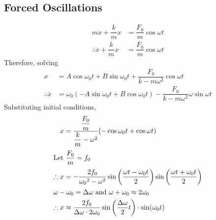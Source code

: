 \documentclass[fleqn, a5paper]{amsart}
\theoremstyle{definition}
\theoremstyle{theorem}
\begin{document}
\subsection{Forced Oscillations}

\begin{align*}
	m \ddot{x} + \dfrac{k}{m} x &= \dfrac{F_0}{m} \cos \omega t\\
	\therefore \ddot{x} + \dfrac{k}{m} x &= \dfrac{F_0}{m} \cos \omega t
\end{align*}
Therefore, solving
\begin{align*}
	x &= A \cos \omega_0 t + B \sin \omega_0 t + \dfrac{F_0}{k - m \omega^2} \cos \omega t\\
	\therefore \dot{x} &= \omega_0 (-A \sin \omega_0 t + B \cos \omega_0 t) - \dfrac{F_0}{k - m \omega^2} \omega \sin \omega t
\end{align*}
Substituting initial conditions,
\begin{align*}
	x &= \dfrac{\dfrac{F_0}{m}}{\dfrac{k}{m} - \omega^2} (-\cos \omega_0 t + \cos \omega t)\\
	\intertext{Let $\dfrac{F_0}{m} = f_0$}
	\therefore x &= -\dfrac{2 f_0}{{\omega_0}^2 - \omega^2} \sin \left( \dfrac{\omega t - \omega_0 t}{2} \right) \sin \left( \dfrac{\omega t + \omega_0 t}{2} \right)\\
	\intertext{$\omega - \omega_0 = \Delta \omega$ and $\omega + \omega_0 \approx 2 \omega_0$}
	\therefore x &\approx \dfrac{2 f_0}{\Delta \omega \cdot 2 \omega_0} \sin \left( \dfrac{\Delta \omega}{2} t \right) \cdot \sin (\omega_0 t)
\end{align*}
\end{document}
